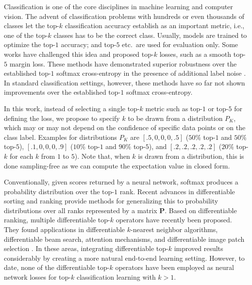 \documentclass{article}
\def\mP{{\bm{P}}}
\newcommand{\revC}[1]{{#1}}
\begin{document}
Classification is one of the core disciplines in machine learning and computer vision.
The advent of classification problems with hundreds or even thousands of classes let the top-$k$ classification accuracy establish as an important metric, i.e., one of the top-$k$ classes has to be the correct class.
Usually, models are trained to optimize the top-$1$ accuracy; and top-$5$ etc.~are used for evaluation only.
Some works \citep{lapin2016loss,berrada2018smooth} have challenged this idea and proposed top-$k$ losses, such as a smooth top-$5$ margin loss.
These methods have demonstrated superior robustness over the established top-$1$ softmax cross-entropy in the presence of additional label noise \citep{berrada2018smooth}.
In standard classification settings, however, these methods have so far not shown improvements over the established top-$1$ softmax cross-entropy.

In this work, instead of selecting a single top-$k$ metric such as top-$1$ or top-$5$ for defining the loss,
we propose to specify $k$ to be drawn from a distribution $P_K$, which may or may not depend on the confidence of specific data points or on the class label.
Examples for distributions $P_K$ are $[.5, 0, 0, 0, .5]$ ($50\%$ top-$1$ and $50\%$ top-$5$), $[.1, 0, 0, 0, .9]$ ($10\%$ top-$1$ and $90\%$ top-$5$), and $[.2, .2, .2, .2, .2]$ ($20\%$ top-$k$ for each $k$ from $1$ to $5$).
\revC{Note that, when $k$ is drawn from a distribution, this is done sampling-free as we can compute the expectation value in closed form.} 

Conventionally, given scores returned by a neural network, softmax produces a probability distribution over the top-$1$ rank.
Recent advances in differentiable sorting and ranking \citep{Grover2019-NeuralSort, prillo2020softsort, Cuturi2019-SortingOT, Petersen2021-diffsort} provide methods for generalizing this to  probability distributions over all ranks represented by a matrix $\mP$.
Based on differentiable ranking, multiple differentiable top-$k$ operators have recently been proposed.
They found applications in differentiable $k$-nearest neighbor algorithms, differentiable beam search, attention mechanisms, and differentiable image patch selection \citep{cordonnier2021differentiable}.
In these areas, integrating differentiable top-$k$ improved results considerably by creating a more natural end-to-end learning setting.
However, to date, none of the differentiable top-$k$ operators have been employed as neural network losses for top-$k$ classification learning with $k>1$.
\end{document}
